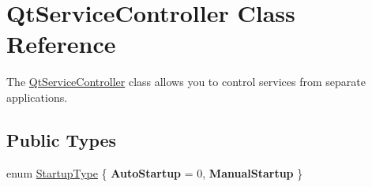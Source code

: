\hypertarget{class_qt_service_controller}{}\section{Qt\+Service\+Controller Class Reference}
\label{class_qt_service_controller}


The \mbox{\hyperlink{class_qt_service_controller}{Qt\+Service\+Controller}} class allows you to control services from separate applications.  


\subsection*{Public Types}
\begin{DoxyCompactItemize}
\item 
enum \mbox{\hyperlink{class_qt_service_controller_a946ac2b079d9760503da923c2eaf0aac}{Startup\+Type}} \{ {\bfseries Auto\+Startup} = 0, 
{\bfseries Manual\+Startup}
 \}
\end{DoxyCompactItemize}
